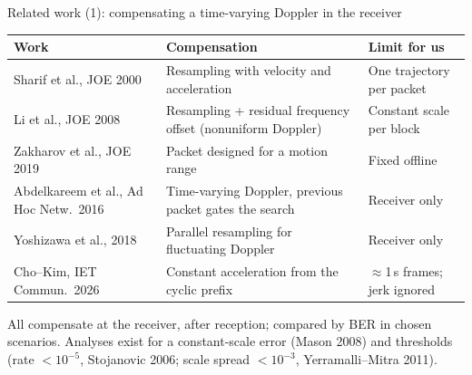 \documentclass[aspectratio=169,11pt]{beamer}
\begin{document}
\begin{frame}{Related work (1): compensating a time-varying Doppler in the receiver}
\scriptsize\setlength{\tabcolsep}{3pt}\renewcommand{\arraystretch}{0.95}
\begin{tabular}{@{}L{0.30\textwidth}L{0.36\textwidth}L{0.30\textwidth}@{}}
\toprule
\textbf{Work} & \textbf{Compensation} & \textbf{Limit for us}\\
\midrule
Sharif et al., JOE 2000 & Resampling with velocity and acceleration & One trajectory per packet\\
Li et al., JOE 2008 & Resampling + residual frequency offset (nonuniform Doppler) & Constant scale per block\\
Zakharov et al., JOE 2019 & Packet designed for a motion range & Fixed offline\\
Abdelkareem et al., Ad Hoc Netw.\ 2016 & Time-varying Doppler, previous packet gates the search & Receiver only\\
Yoshizawa et al., 2018 & Parallel resampling for fluctuating Doppler & Receiver only\\
Cho--Kim, IET Commun.\ 2026 & Constant acceleration from the cyclic prefix & $\approx$1\,s frames; jerk ignored\\
\bottomrule
\end{tabular}

\vspace{1mm}
\footnotesize All compensate at the receiver, after reception; compared by BER in chosen scenarios. Analyses exist for a constant-scale error (Mason 2008) and thresholds (rate $<10^{-5}$, Stojanovic 2006; scale spread $<10^{-3}$, Yerramalli--Mitra 2011).
\end{frame}
\end{document}
